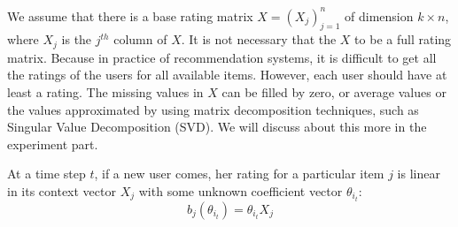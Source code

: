 \documentclass[twoside,leqno,twocolumn]{article}
\newcommand{\pp}[1]{\color{red}(pp) #1\color{black}}
\newcommand{\hai}[1]{\color{blue}(hai) #1\color{black}}
\begin{document}
We assume that there is a base rating matrix $X=(X_{j})_{j=1}^{n}$ of dimension $k\times n$, where $X_{j}$ is the $j^{th}$ column of $X$. It is not necessary that the $X$ to be a full rating matrix. Because in practice of recommendation systems, it is difficult to get all the ratings of the users for all available items. However, each user should have at least a rating. The missing values in $X$ can be filled by zero, or average values or the values approximated by using matrix decomposition techniques, such as Singular Value Decomposition (SVD). We will discuss about this more in the experiment part.

At a time step $t$, if a new user comes, her rating for a particular item $j$ is linear in its context vector $X_{j}$ with some unknown coefficient vector $\theta_{i_{t}}$:
$$
b_{j}(\theta_{i_{t}}) = \theta_{i_{t}}X_{j}
$$

\end{document}
